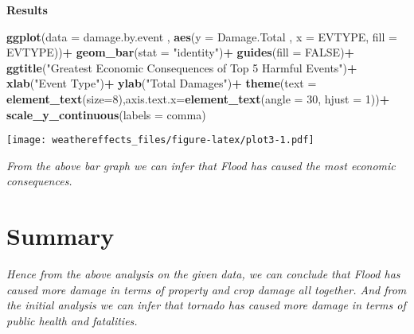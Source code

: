 \documentclass[
]{article}
\newenvironment{Shaded}{\begin{snugshade}}{\end{snugshade}}
\newcommand{\DataTypeTok}[1]{\textcolor[rgb]{0.13,0.29,0.53}{#1}}
\newcommand{\DecValTok}[1]{\textcolor[rgb]{0.00,0.00,0.81}{#1}}
\newcommand{\KeywordTok}[1]{\textcolor[rgb]{0.13,0.29,0.53}{\textbf{#1}}}
\newcommand{\NormalTok}[1]{#1}
\newcommand{\OperatorTok}[1]{\textcolor[rgb]{0.81,0.36,0.00}{\textbf{#1}}}
\newcommand{\OtherTok}[1]{\textcolor[rgb]{0.56,0.35,0.01}{#1}}
\newcommand{\StringTok}[1]{\textcolor[rgb]{0.31,0.60,0.02}{#1}}
\begin{document}
\textbf{Results}

\begin{Shaded}
\begin{Highlighting}[]
\KeywordTok{ggplot}\NormalTok{(}\DataTypeTok{data =}\NormalTok{ damage.by.event , }\KeywordTok{aes}\NormalTok{(}\DataTypeTok{y =}\NormalTok{ Damage.Total , }\DataTypeTok{x =}\NormalTok{ EVTYPE, }\DataTypeTok{fill =}\NormalTok{ EVTYPE))}\OperatorTok{+}
\StringTok{    }\KeywordTok{geom_bar}\NormalTok{(}\DataTypeTok{stat =} \StringTok{"identity"}\NormalTok{)}\OperatorTok{+}
\StringTok{    }\KeywordTok{guides}\NormalTok{(}\DataTypeTok{fill =} \OtherTok{FALSE}\NormalTok{)}\OperatorTok{+}
\StringTok{    }\KeywordTok{ggtitle}\NormalTok{(}\StringTok{"Greatest Economic Consequences of Top 5 Harmful Events"}\NormalTok{)}\OperatorTok{+}
\StringTok{    }\KeywordTok{xlab}\NormalTok{(}\StringTok{"Event Type"}\NormalTok{)}\OperatorTok{+}
\StringTok{    }\KeywordTok{ylab}\NormalTok{(}\StringTok{"Total Damages"}\NormalTok{)}\OperatorTok{+}
\StringTok{    }\KeywordTok{theme}\NormalTok{(}\DataTypeTok{text =} \KeywordTok{element_text}\NormalTok{(}\DataTypeTok{size=}\DecValTok{8}\NormalTok{),}\DataTypeTok{axis.text.x=}\KeywordTok{element_text}\NormalTok{(}\DataTypeTok{angle =} \DecValTok{30}\NormalTok{, }\DataTypeTok{hjust =} \DecValTok{1}\NormalTok{))}\OperatorTok{+}
\StringTok{    }\KeywordTok{scale_y_continuous}\NormalTok{(}\DataTypeTok{labels =}\NormalTok{ comma)}
\end{Highlighting}
\end{Shaded}

\texttt{[image: weathereffects\_files/figure-latex/plot3-1.pdf]}

\emph{From the above bar graph we can infer that Flood has caused the
most economic consequences.}

\hypertarget{summary}{%
\section{Summary}\label{summary}}

\emph{Hence from the above analysis on the given data, we can conclude
that Flood has caused more damage in terms of property and crop damage
all together. And from the initial analysis we can infer that tornado
has caused more damage in terms of public health and fatalities.}
\end{document}
